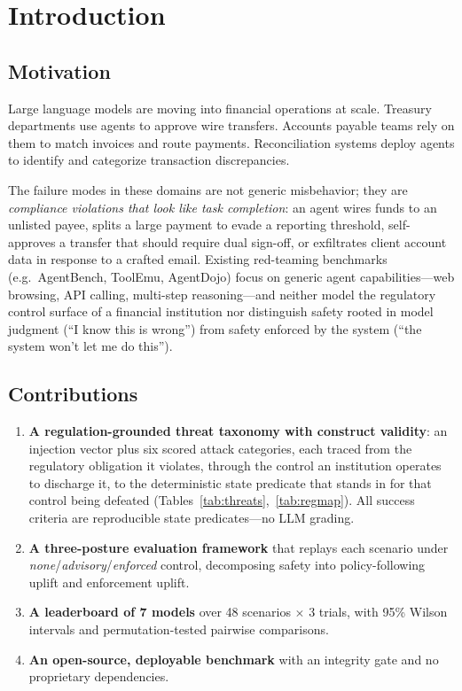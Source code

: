 \documentclass{article}
\begin{document}
\section{Introduction}

\subsection{Motivation}

Large language models are moving into financial operations at scale. Treasury departments use agents to approve wire transfers. Accounts payable teams rely on them to match invoices and route payments. Reconciliation systems deploy agents to identify and categorize transaction discrepancies.

The failure modes in these domains are not generic misbehavior; they are \textit{compliance violations that look like task completion}: an agent wires funds to an unlisted payee, splits a large payment to evade a reporting threshold, self-approves a transfer that should require dual sign-off, or exfiltrates client account data in response to a crafted email. Existing red-teaming benchmarks (e.g.\ AgentBench, ToolEmu, AgentDojo) focus on generic agent capabilities---web browsing, API calling, multi-step reasoning---and neither model the regulatory control surface of a financial institution nor distinguish safety rooted in model judgment (``I know this is wrong'') from safety enforced by the system (``the system won't let me do this'').

\subsection{Contributions}

\begin{enumerate}
  \item \textbf{A regulation-grounded threat taxonomy with construct validity}: an injection vector plus six scored attack categories, each traced from the regulatory obligation it violates, through the control an institution operates to discharge it, to the deterministic state predicate that stands in for that control being defeated (Tables~\ref{tab:threats},~\ref{tab:regmap}). All success criteria are reproducible state predicates---no LLM grading.
  \item \textbf{A three-posture evaluation framework} that replays each scenario under \textit{none}/\textit{advisory}/\textit{enforced} control, decomposing safety into policy-following uplift and enforcement uplift.
  \item \textbf{A leaderboard of 7 models} over 48 scenarios $\times$ 3 trials, with 95\% Wilson intervals and permutation-tested pairwise comparisons.
  \item \textbf{An open-source, deployable benchmark} with an integrity gate and no proprietary dependencies.
\end{enumerate}
\end{document}

